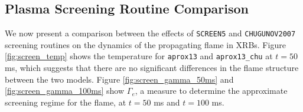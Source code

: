 \documentclass[preprint,times,tighten,linenumbers]{aastex631}
\begin{document}
\subsection{Plasma Screening Routine Comparison}\label{Sec:result_screening}









\begin{figure*}
\centering
{}
\caption{\label{fig:screen_temp} Slice plots comparing temperature for {\tt aprox13} (top panel) and {\tt aprox13\_chu} (bottom panel) at $t = 50$ ms.}
\end{figure*}


\begin{figure*}
\centering
{}
\caption{\label{fig:screen_gamma_50ms} Slice plots comparing $\Gamma_e$ for {\tt aprox13} (top panel) and {\tt aprox13\_chu} (bottom panel) at $t = 50$ ms.}
\end{figure*}


\begin{figure*}
\centering
{}
\caption{\label{fig:screen_gamma_100ms} Slice plots comparing $\Gamma_e$ for {\tt aprox13} (top panel) and {\tt aprox13\_chu} (bottom panel) at $t = 100$ ms.}
\end{figure*}

We now present a comparison between the effects of {\tt SCREEN5} and {\tt CHUGUNOV2007} screening routines on the dynamics of the propagating flame in XRBs. Figure \ref{fig:screen_temp} shows the temperature for {\tt aprox13} and {\tt aprox13\_chu} at $t = 50$ ms, which suggests that there are no significant differences in the flame structure between the two models. Figure \ref{fig:screen_gamma_50ms} and \ref{fig:screen_gamma_100ms} show $\Gamma_e$, a measure to determine the approximate screening regime for the flame, at $t = 50$ ms and $t = 100$ ms. 
\end{document}
